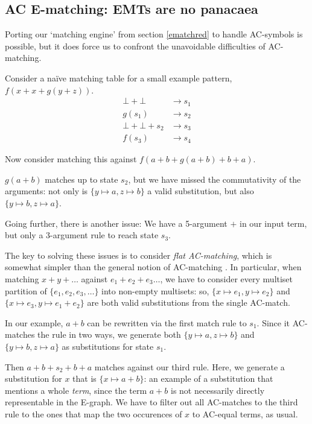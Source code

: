 \documentclass[12pt,a4paper,twoside,openright]{report}
\numberwithin{equation}{chapter}		%
\numberwithin{figure}{chapter}			%
\numberwithin{table}{chapter}			%
\theoremstyle{definition}
\theoremstyle{plain}
\begin{document}
\subsection{AC E-matching: EMTs are no panacaea} \label{panacea}
Porting our `matching engine' from section \ref{ematchred} to handle AC-symbols is possible, but it does force us to confront the unavoidable difficulties of AC-matching.

Consider a na\"ive matching table for a small example pattern, $f(x + x + g(y + z))$.
\begin{align*}
	\bot + \bot &\rightarrow s_1 \\
	g(s_1) &\rightarrow s_2 \\
	\bot + \bot + s_2 &\rightarrow s_3 \\
	f(s_3) &\rightarrow s_4
\end{align*}

Now consider matching this against $f(a + b + g(a + b) + b + a)$.

$g(a + b)$ matches up to state $s_2$, but we have missed the commutativity of the arguments: not only is $\{y \mapsto a, z \mapsto b\}$ a valid substitution, but also $\{y \mapsto b, z \mapsto a\}$.

Going further, there is another issue: We have a 5-argument $+$ in our input term, but only a 3-argument rule to reach state $s_3$.

The key to solving these issues is to consider \emph{flat AC-matching}, which is somewhat simpler than the general notion of AC-matching \cite[Chapter 8]{robinson_handbook_2001}. In particular, when matching $x + y + \ldots$ against $e_1 + e_2 + e_3 \ldots$, we have to consider every multiset partition of $\{e_1, e_2, e_3, \ldots\}$ into non-empty multisets: so, $\{x \mapsto e_1, y \mapsto e_2\}$ and $\{x \mapsto e_3, y \mapsto e_1 + e_2\}$ are both valid substitutions from the single AC-match.

In our example, $a + b$ can be rewritten via the first match rule to $s_1$. Since it AC-matches the rule in two ways, we generate both $\{y \mapsto a, z \mapsto b\}$ and $\{y \mapsto b, z \mapsto a\}$ as substitutions for state $s_1$.

Then $a + b + s_2 + b + a$ matches against our third rule. Here, we generate a substitution for $x$ that is $\{x \mapsto a + b\}$: an example of a substitution that mentions a whole \emph{term}, since the term $a + b$ is not necessarily directly representable in the E-graph. We have to filter out all AC-matches to the third rule to the ones that map the two occurences of $x$ to AC-equal terms, as usual.
\end{document}

